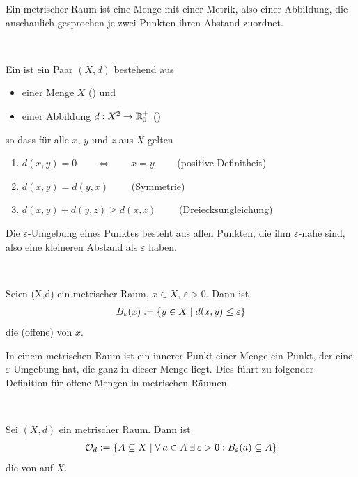     Ein
    metrischer Raum ist eine Menge mit einer Metrik, also einer Abbildung, die anschaulich gesprochen je zwei Punkten ihren Abstand zuordnet.
    \begin{dfn}\label{def:metr}\ \vspace{8pt}

        \noindent
        Ein  ist ein Paar $(X,d)$ bestehend aus
        \begin{itemize}
            \item einer Menge $X$ () und
            \item einer Abbildung $ d: X^2 \rightarrow \mathbb{R}_0^+$ ()
        \end{itemize}
        so dass für alle $x$, $y$ und $z$ aus $X$ gelten
        \begin{enumerate}
            \item $d(x,y) = 0 \quad \quad \Leftrightarrow \quad \quad x=y \qquad$ (positive Definitheit) 
            \item $d(x,y) = d(y,x) \qquad$ (Symmetrie)
            \item $d(x,y) + d(y,z) \geq d(x,z) \qquad$ (Dreiecksungleichung)
        \end{enumerate}
    \end{dfn}


    Die
    $\varepsilon$-Umgebung eines Punktes besteht aus allen Punkten, die ihm $\varepsilon$-nahe sind, also eine kleineren Abstand als $\varepsilon$ haben.
    \begin{dfn}\label{def:eps-umg}\ \vspace{8pt}

        \noindent
        Seien (X,d) ein metrischer Raum, $x \in X$, $\varepsilon > 0$. Dann ist
        \begin{align*}
            B_\varepsilon(x) := \{y \in X \mid d(x,y) \leq \varepsilon \}
        \end{align*}
        die (offene)  von $x$.
        
    \end{dfn}


    In
    einem metrischen Raum ist ein innerer Punkt einer Menge ein Punkt, der eine $\varepsilon$-Umgebung hat, die ganz in dieser Menge liegt. Dies führt zu folgender Definition für offene Mengen in metrischen Räumen.
    \begin{dfn} \label{def:topMet} \ \vspace{8pt}

        \noindent
        Sei $(X,d)$ ein metrischer Raum. Dann ist
        \begin{align*}
            \mathcal{O}_d := \{A \subseteq X \mid \forall\: a \in A \; \exists\: \varepsilon > 0: B_\varepsilon(a) \subseteq A \}
        \end{align*}
        die von  auf $X$.
        
    \end{dfn}

